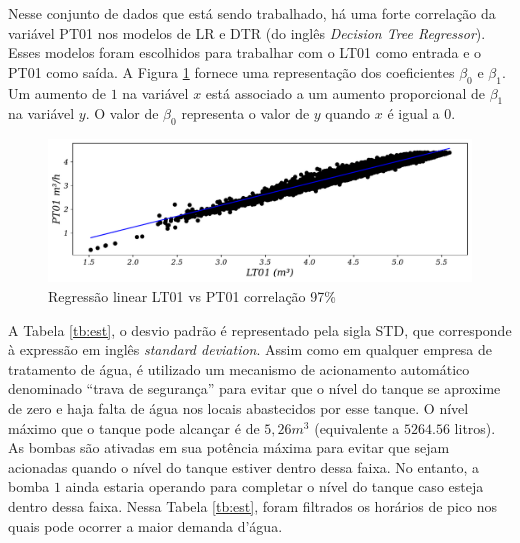 Nesse conjunto de dados que está sendo trabalhado, há uma forte correlação da variável PT01 nos modelos de LR e DTR (do inglês \textit{Decision Tree Regressor}). Esses modelos foram escolhidos para trabalhar com o LT01 como entrada e o PT01 como saída. A Figura \ref{fig:lr-lt01-m3} fornece uma representação dos coeficientes $\beta_0$ e $\beta_1$. Um aumento de $1$ na variável $x$ está associado a um aumento proporcional de $\beta_1$ na variável $y$. O valor de $\beta_0$ representa o valor de $y$ quando $x$ é igual a $0$.

\begin{figure}[!htb]
	\centering
	\caption{Regressão linear LT01 vs PT01 correlação 97\%}
	\label{fig:lr-lt01-m3}
	\includegraphics[width=0.7\linewidth]{"Modelos/Figuras/LR LT01 (m³)"}
	
	
\end{figure}







A Tabela \ref{tb:est}, o desvio padrão é representado pela sigla STD, que corresponde à expressão em inglês \textit{standard deviation}. Assim como em qualquer empresa de tratamento de água, é utilizado um mecanismo de acionamento automático denominado ``trava de segurança'' para evitar que o nível do tanque se aproxime de zero e haja falta de água nos locais abastecidos por esse tanque. O nível máximo que o tanque pode alcançar é de $5,26 m^3$ (equivalente a $5264.56$ litros). As bombas são ativadas em sua potência máxima para evitar que sejam acionadas quando o nível do tanque estiver dentro dessa faixa. No entanto, a bomba $1$ ainda estaria operando para completar o nível do tanque caso esteja dentro dessa faixa. Nessa Tabela \ref{tb:est}, foram filtrados os horários de pico nos quais pode ocorrer a maior demanda d'água.

